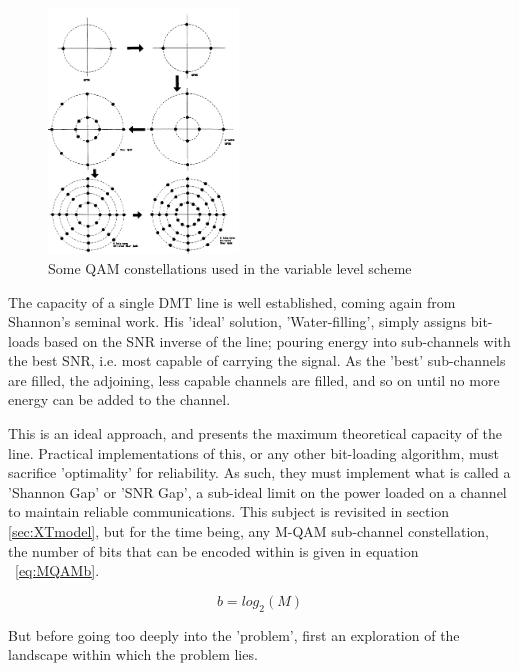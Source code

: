\begin{figure}[h!]
  \centering
  \includegraphics[width=0.45\textwidth]{images/variable_qam.png}
  \caption{Some QAM constellations used in the variable level scheme}
  \label{fig:QAM_examples}
\end{figure}

The capacity of a single DMT line is well established, coming again from Shannon's seminal work\cite{CS48}. His 'ideal' solution, 'Water-filling', simply assigns bit-loads based on the SNR inverse of the line; pouring energy into sub-channels with the best SNR, i.e. most capable of carrying the signal. As the 'best' sub-channels are filled, the adjoining, less capable channels are filled, and so on until no more energy can be added to the channel. 

This is an ideal approach, and presents the maximum theoretical capacity of the line. Practical implementations of this, or any other bit-loading algorithm, must sacrifice 'optimality' for reliability. As such, they must implement what is called a 'Shannon Gap' or 'SNR Gap', a sub-ideal limit on the power loaded on a channel to maintain reliable communications. This subject is revisited in section \ref{sec:XTmodel}, but for the time being, any M-QAM sub-channel constellation, the number of bits that can be encoded within is given in equation ~\ref{eq:MQAMb}\cite{CS48}.

\begin{equation}\label{eq:MQAMb}
b=log_2(M)
\end{equation}

But before going too deeply into the 'problem', first an exploration of the landscape within which the problem lies.


